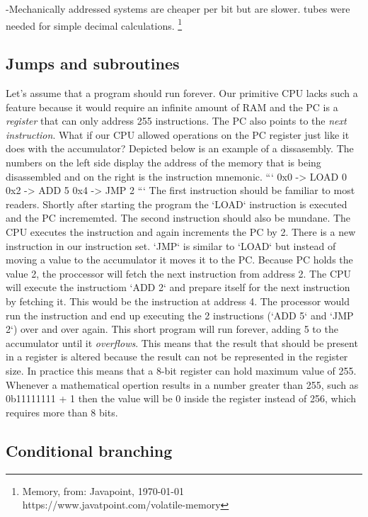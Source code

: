 -Mechanically addressed systems are cheaper per bit but are slower. 
tubes were needed for simple decimal calculations. \footnote{Memory, from: Javapoint, \today \\ https://www.javatpoint.com/volatile-memory}


\subsection{Jumps and subroutines}

Let's assume that a program should run forever. Our primitive CPU lacks such a feature because it
would require an infinite amount of RAM and the PC is a \textit{register} that can only address 255 
instructions. The PC also points to the \textit{next instruction}. What if our CPU allowed operations on
the PC register just like it does with the accumulator? Depicted below is an example of a 
dissasembly. The numbers on the left side display the address of the memory that is being
disassembled and on the right is the instruction mnemonic.
```
0x0 -> LOAD 0
0x2 -> ADD 5
0x4 -> JMP 2
```
The first instruction should be familiar to most readers. Shortly after starting the program the 
`LOAD` instruction is executed and the PC incrememted. The second instruction should also be mundane.
The CPU executes the instruction and again increments the PC by 2. There is a new instruction in our 
instruction set. `JMP` is similar to `LOAD` but instead of
moving a value to the accumulator it moves it to the PC. Because PC holds the value 2, the
proccessor will fetch the next instruction from address 2. The CPU will execute the instructiom
`ADD 2` and prepare itself for the next instruction by fetching it. This would be the instruction
at address 4. The processor would run the instruction and end up executing the 2 instructions
(`ADD 5` and `JMP 2`) over and over again. This short program will run forever, adding 5 to the
accumulator until it \textit{overflows}. This means that the result that should be present in a register
is altered because the result can not be represented in the register size. In practice this means
that a 8-bit register can hold maximum value of 255. Whenever a mathematical opertion results in a 
number greater than 255, such as 0b11111111 + 1 then the value will be 0 inside the register instead
of 256, which requires more than 8 bits.

\subsection{Conditional branching}

